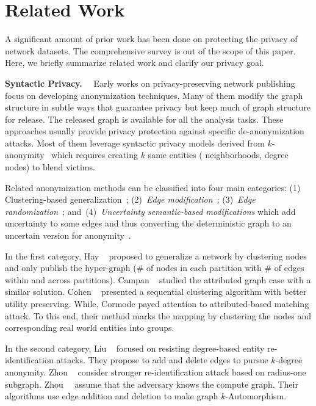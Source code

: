 \section{Related Work}
\label{sec:relatedWork}
A significant amount of prior work has been done on protecting the privacy of network datasets.
The comprehensive survey is out of the scope of this paper. 
Here, we briefly summarize related work and clarify our privacy goal. 

\textbf{Syntactic Privacy.}~~
Early works on privacy-preserving network publishing focus on developing anonymization techniques. 
Many of them modify the graph structure in subtle ways that guarantee privacy but keep much of graph structure for release. 
The released graph is available for all the analysis tasks. 
These approaches usually provide privacy protection against specific de-anonymization attacks. 
Most of them leverage syntactic privacy models derived from $k$-anonymity~\cite{Sweeney:2002:KAM:774544.774552} which requires creating $k$ same entities ({\eg} neighborhoods, degree nodes) to blend victims. 

Related anonymization methods can be classified into four main categories: (1) Clustering-based generalization~\cite{Hay_Anonymizing_2007,Bhagat_Class_2009,hay2010resisting}; (2)~{\em Edge modification}~\cite{Liu_Towards_2008, Zhou_Preserving_2008, Zou:2009, Wang2011, Wu_k_2010, Skarkala_Privacy_2012}; 
(3)~{\em Edge randomization}~\cite{Liu_Privacy_2009,Ying_Randomizing_2008, Ninggal_Utility_2015};
and~(4)~{\em Uncertainty semantic-based modifications} which add uncertainty to some edges and thus converting the deterministic graph to an uncertain version for anonymity~\cite{Boldi_Injecting_2012, Nguyen_Anonymizing_2015}. 

In the first category, Hay {\etal}~\cite{Hay_Anonymizing_2007} proposed to generalize a network by clustering nodes and only publish the hyper-graph ($\#$ of nodes in each partition with $\#$ of edges within and across partitions). Campan {\etal}~\cite{Campan2008} studied the attributed graph case with a similar solution. 
Cohen {\etal}~\cite{Cohen2013} presented a sequential clustering algorithm with better utility preserving. While, Cormode{\etal} \cite{Bhagat_Class_2009} payed attention to attributed-based matching attack. To this end, their method marks the mapping by clustering the nodes and corresponding real world entities into groups. 

In the second category, Liu {\etal}~\cite{Liu_Towards_2008} focused on resisting degree-based entity re-identification attacks. They propose to add and delete edges to pursue $k$-degree anonymity. Zhou {\etal}~\cite{Zhou_Preserving_2008} consider stronger re-identification attack based on radius-one subgraph. Zhou~{\etal}~\cite{Zou:2009} assume that the adversary knows the compute graph. Their algorithms use edge addition and deletion to make graph $k$-Automorphism.  

